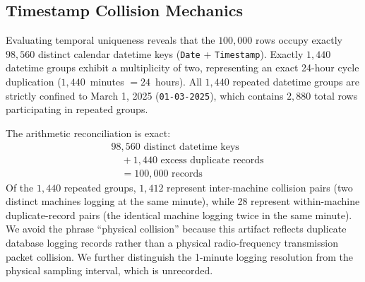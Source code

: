\documentclass[journal]{IEEEtran}
\begin{document}
\subsection{Timestamp Collision Mechanics}
Evaluating temporal uniqueness reveals that the $100{,}000$ rows occupy exactly $98{,}560$ distinct calendar datetime keys (\texttt{Date} + \texttt{Timestamp}). Exactly $1{,}440$ datetime groups exhibit a multiplicity of two, representing an exact 24-hour cycle duplication ($1{,}440$~minutes $= 24$~hours). All $1{,}440$ repeated datetime groups are strictly confined to March 1, 2025 (\texttt{01-03-2025}), which contains $2{,}880$ total rows participating in repeated groups.

The arithmetic reconciliation is exact:
\begin{equation}
\begin{aligned}
& 98{,}560 \text{ distinct datetime keys} \\
& \quad + 1{,}440 \text{ excess duplicate records} \\
& \quad = 100{,}000 \text{ records}
\end{aligned}
\end{equation}
Of the $1{,}440$ repeated groups, $1{,}412$ represent inter-machine collision pairs (two distinct machines logging at the same minute), while 28 represent within-machine duplicate-record pairs (the identical machine logging twice in the same minute). We avoid the phrase ``physical collision'' because this artifact reflects duplicate database logging records rather than a physical radio-frequency transmission packet collision. We further distinguish the 1-minute logging resolution from the physical sampling interval, which is unrecorded.
\end{document}
